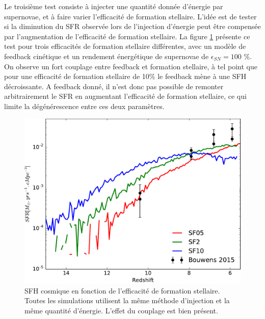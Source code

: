 Le troisième test consiste à injecter une quantité donnée d'énergie par supernovae, et à faire varier l'efficacité de formation stellaire.
L'idée est de tester si la diminution du \ac{SFR} observée lors de l'injection d'énergie peut être compensée par l'augmentation de l'efficacité de formation stellaire.
La figure \ref{fig:sfr_sfe} présente ce test pour trois efficacités de formation stellaire différentes, avec un modèle de feedback cinétique et un rendement énergétique de supernovae de $\epsilon_{SN}=100$ \%.
On observe un fort couplage entre feedback et formation stellaire, à tel point que pour une efficacité de formation stellaire de 10\% le feedback mène à une \ac{SFH} décroissante.
A feedback donné, il n'est donc pas possible de remonter arbitrairement le \ac{SFR} en augmentant l'efficacité de formation stellaire, ce qui limite la dégénérescence entre ces deux paramètres.

\begin{figure}
        \includegraphics[width=.95\textwidth]{img/03/sedov/SFR_sfeff.pdf} 
        \caption[SFH cosmique en fonction de l'efficacité de formation stellaire]{SFH cosmique en fonction de l'efficacité de formation stellaire.
        Toutes les simulations utilisent la même méthode d'injection et la même quantité d'énergie.
		L'effet du couplage est bien présent.
        }
 		\label{fig:sfr_sfe}
\end{figure}





%
